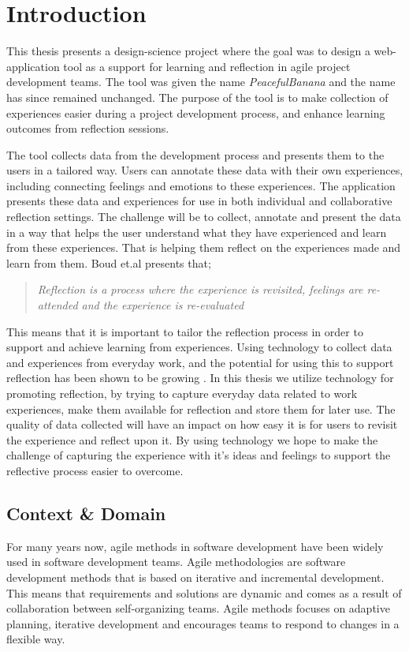 \chapter{Introduction}
This thesis presents a design-science project where the goal was to design a web-application tool as a support for learning and reflection in agile project development teams. The tool was given the name \emph{PeacefulBanana} and the name has since remained unchanged. The purpose of the tool is to make collection of experiences easier during a project development process, and enhance learning outcomes from reflection sessions. 

The tool collects data from the development process and presents them to the users in a tailored way. Users can annotate these data with their own experiences, including connecting feelings and emotions to these experiences. The application presents these data and experiences for use in both individual and collaborative reflection settings. The challenge will be to collect, annotate and present the data in a way that helps the user understand what they have experienced and learn from these experiences. That is helping them reflect on the experiences made and learn from them. Boud et.al\citep{boudreflection1985} presents that; 
\begin{quote}
\emph{Reflection is a process where the experience is revisited, feelings are re-attended and the experience is re-evaluated}
\end{quote}
This means that it is important to tailor the reflection process in order to support and achieve learning from experiences. Using technology to collect data and experiences from everyday work, and the potential for using this to support reflection has been shown to be growing \citep{li2011understanding}. In this thesis we utilize technology for promoting reflection, by trying to capture everyday data related to work experiences, make them available for reflection and store them for later use. The quality of data collected will have an impact on how easy it is for users to revisit the experience and reflect upon it. By using technology we hope to make the challenge of capturing the experience with it's ideas and feelings to support the reflective process easier to overcome. 

\section{Context \& Domain}
For many years now, agile methods in software development have been widely used in software development teams. Agile methodologies are software development methods that is based on iterative and incremental development. This means that requirements and solutions are dynamic and comes as a result of collaboration between self-organizing teams. Agile methods focuses on adaptive planning, iterative development and encourages teams to respond to changes in a flexible way. 

